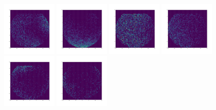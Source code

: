 \documentclass[12pt,prd]{article}
\begin{document}
\begin{figure}[h!]
\includegraphics[width=0.24\textwidth]{../figures/stars_passing_cutgaiascan_l101_2_b58_4_ra212_7_dec55_2_npy_9.pdf}
\includegraphics[width=0.24\textwidth]{../figures/stars_passing_cutgaiascan_l101_2_b58_4_ra212_7_dec55_2_npy_10.pdf}
\includegraphics[width=0.24\textwidth]{../figures/stars_passing_cutgaiascan_l101_2_b58_4_ra212_7_dec55_2_npy_11.pdf}
\includegraphics[width=0.24\textwidth]{../figures/stars_passing_cutgaiascan_l101_2_b58_4_ra212_7_dec55_2_npy_12.pdf}
\includegraphics[width=0.24\textwidth]{../figures/stars_passing_cutgaiascan_l101_2_b58_4_ra212_7_dec55_2_npy_13.pdf}
\includegraphics[width=0.24\textwidth]{../figures/stars_passing_cutgaiascan_l101_2_b58_4_ra212_7_dec55_2_npy_14.pdf}

\end{figure}
\end{document}
